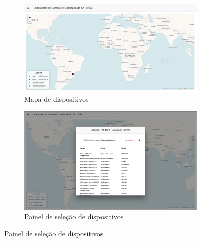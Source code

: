\begin{figure}[h]
    \centering
    \caption{Aplicação \textit{front-end} da plataforma web Renovar}
    \begin{subfigure}{0.495\textwidth}
        \includegraphics[width=\textwidth]{chapters/2-CLEAN/Figuras/Renovar main panel.jpeg}
        \caption{Mapa de dispositivos}
        \label{fig:renovar-map-2}
    \end{subfigure}
    \hfill
    \begin{subfigure}{0.495\textwidth}
        \includegraphics[width=\textwidth]{chapters/2-CLEAN/Figuras/Renovar Device Information.png}
        \caption{Painel de seleção de dispositivos}
        \label{fig:renovar-devices}
    \end{subfigure}
    \hfill
    \label{fig:renovar-map-and-devices}
\end{figure}

